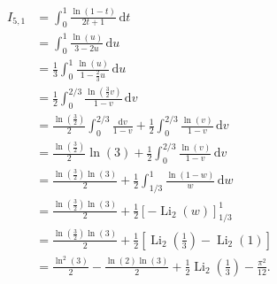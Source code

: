 \begin{align}
I_{5,1}
&=\int_{0}^{1}\frac{\ln{(1-t)}}{2t+1}\,\mathrm{d}t\\
&=\int_{0}^{1}\frac{\ln{(u)}}{3-2u}\,\mathrm{d}u\\
&=\frac13\int_{0}^{1}\frac{\ln{(u)}}{1-\frac23u}\,\mathrm{d}u\\
&=\frac12\int_{0}^{2/3}\frac{\ln{\left(\frac32v\right)}}{1-v}\,\mathrm{d}v\\
&=\frac{\ln{\left(\frac32\right)}}{2}\int_{0}^{2/3}\frac{\mathrm{d}v}{1-v}+\frac12\int_{0}^{2/3}\frac{\ln{\left(v\right)}}{1-v}\,\mathrm{d}v\\
&=\frac{\ln{\left(\frac32\right)}}{2}\ln{(3)}+\frac12\int_{0}^{2/3}\frac{\ln{\left(v\right)}}{1-v}\,\mathrm{d}v\\
&=\frac{\ln{\left(\frac32\right)}\ln{(3)}}{2}+\frac12\int_{1/3}^{1}\frac{\ln{\left(1-w\right)}}{w}\,\mathrm{d}w\\
&=\frac{\ln{\left(\frac32\right)}\ln{(3)}}{2}+\frac12\left[-\operatorname{Li}_{2}{\left(w\right)}\right]_{1/3}^{1}\\
&=\frac{\ln{\left(\frac32\right)}\ln{(3)}}{2}+\frac12\left[\operatorname{Li}_{2}{\left(\frac13\right)}-\operatorname{Li}_{2}{\left(1\right)}\right]\\
&=\frac{\ln^2{(3)}}{2}-\frac{\ln{(2)}\ln{(3)}}{2}+\frac12\operatorname{Li}_{2}{\left(\frac13\right)}-\frac{\pi^2}{12}.
\end{align}